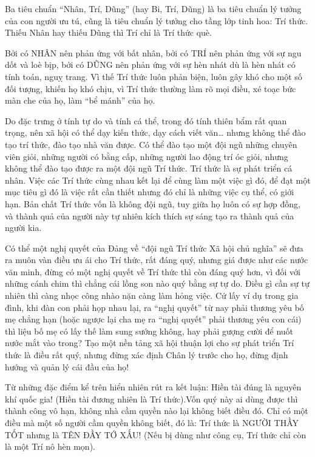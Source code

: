 Ba tiêu chuẩn “Nhân, Trí, Dũng” (hay Bi, Trí, Dũng) là ba tiêu chuẩn lý tưởng của con người ưu tú, cũng là tiêu chuẩn lý tưởng cho tầng lớp tinh hoa: Trí thức. Thiếu Nhân hay thiếu Dũng thì Trí chỉ là Trí thức què.

Bởi có NHÂN nên phản ứng với bất nhân, bởi có TRÍ nên phản ứng với sự ngu dốt và loè bịp, bởi có DŨNG nên phản ứng với sự hèn nhát dù là hèn nhát có tính toán, nguỵ trang. Vì thế Trí thức luôn phản biện, luôn gây khó cho một số đối tượng, khiến họ khó chịu, vì Trí thức thường làm rõ mọi điều, xé toạc bức màn che của họ, làm “bể mánh” của họ.

Do đặc trưng ở tính tự do và tính cá thể, trong đó tính thiên bẩm rất quan trọng, nên xã hội có thể dạy kiến thức, dạy cách viết văn… nhưng không thể đào tạo trí thức, đào tạo nhà văn được. Có thể đào tạo một đội ngũ những chuyên viên giỏi, những người có bằng cấp, những người lao động trí óc giỏi, nhưng không thể đào tạo được ra một đội ngũ Trí thức. Trí thức là sự phát triển cá nhân. Việc các Trí thức cùng nhau kết lại để cùng làm một việc gì đó, để đạt một mục tiêu gì đó là việc rất cần thiết nhưng đó chỉ là những việc cụ thể, có giới hạn. Bản chất Trí thức vốn là không đội ngũ, tuy giữa họ luôn có sự hợp đồng, và thành quả của người này tự nhiên kích thích sự sáng tạo ra thành quả của người kia.

Có thể một nghị quyết của Đảng về “đội ngũ Trí thức Xã hội chủ nghĩa” sẽ đưa ra muôn vàn điều ưu ái cho Trí thức, rất đáng quý, nhưng giá được như các nước văn minh, đừng có một nghị quyết về Trí thức thì còn đáng quý hơn, vì đối với những cánh chim thì chẳng cái lồng son nào quý bằng sự tự do. Điều gì cần sự tự nhiên thì càng nhọc công nhào nặn càng làm hỏng việc. Cứ lấy ví dụ trong gia đình, khi đàn con phải họp nhau lại, ra “nghị quyết” từ nay phải thương yêu bố mẹ chẳng hạn (hoặc ngược lại cha mẹ ra “nghị quyết” phải thương yêu con cái) thì liệu bố mẹ có lấy thế làm sung sướng không, hay phải gượng cười để nuốt nước mắt vào trong? Tạo một nền tảng xã hội thuận lợi cho sự phát triển Trí thức là điều rất quý, nhưng đừng xác định Chân lý trước cho họ, đừng định hướng và quản lý cái đầu của họ!

Từ những đặc điểm kể trên hiển nhiên rút ra kết luận: Hiền tài đúng là nguyên khí quốc gia! (Hiền tài đương nhiên là Trí thức).Vốn quý này ai dùng được thì thành công vô hạn, không nhà cầm quyền nào lại không biết điều đó. Chỉ có một điều mà một số người cầm quyền không biết, đó là: Trí thức là NGƯỜI THẦY TỐT nhưng là TÊN ĐẦY TỚ XẤU! (Nếu bị dùng như công cụ, Trí thức chỉ còn là một Trí nô hèn mọn).

